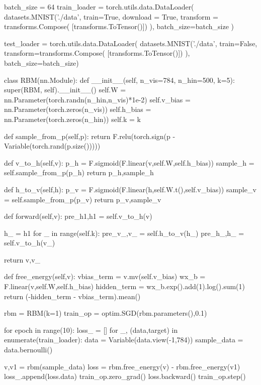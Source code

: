 \documentclass[%
oneside,                 %
final,                   %
10pt]{article}
\begin{document}
batch_size = 64
train_loader = torch.utils.data.DataLoader(
datasets.MNIST('./data',
    train=True,
    download = True,
    transform = transforms.Compose(
        [transforms.ToTensor()])
     ),
     batch_size=batch_size
)

test_loader = torch.utils.data.DataLoader(
datasets.MNIST('./data',
    train=False,
    transform=transforms.Compose(
    [transforms.ToTensor()])
    ),
    batch_size=batch_size)


class RBM(nn.Module):
   def __init__(self,
               n_vis=784,
               n_hin=500,
               k=5):
        super(RBM, self).__init__()
        self.W = nn.Parameter(torch.randn(n_hin,n_vis)*1e-2)
        self.v_bias = nn.Parameter(torch.zeros(n_vis))
        self.h_bias = nn.Parameter(torch.zeros(n_hin))
        self.k = k
    
   def sample_from_p(self,p):
       return F.relu(torch.sign(p - Variable(torch.rand(p.size()))))
    
   def v_to_h(self,v):
        p_h = F.sigmoid(F.linear(v,self.W,self.h_bias))
        sample_h = self.sample_from_p(p_h)
        return p_h,sample_h
    
   def h_to_v(self,h):
        p_v = F.sigmoid(F.linear(h,self.W.t(),self.v_bias))
        sample_v = self.sample_from_p(p_v)
        return p_v,sample_v
        
   def forward(self,v):
        pre_h1,h1 = self.v_to_h(v)
        
        h_ = h1
        for _ in range(self.k):
            pre_v_,v_ = self.h_to_v(h_)
            pre_h_,h_ = self.v_to_h(v_)
        
        return v,v_
    
   def free_energy(self,v):
        vbias_term = v.mv(self.v_bias)
        wx_b = F.linear(v,self.W,self.h_bias)
        hidden_term = wx_b.exp().add(1).log().sum(1)
        return (-hidden_term - vbias_term).mean()




rbm = RBM(k=1)
train_op = optim.SGD(rbm.parameters(),0.1)

for epoch in range(10):
    loss_ = []
    for _, (data,target) in enumerate(train_loader):
        data = Variable(data.view(-1,784))
        sample_data = data.bernoulli()
        
        v,v1 = rbm(sample_data)
        loss = rbm.free_energy(v) - rbm.free_energy(v1)
        loss_.append(loss.data)
        train_op.zero_grad()
        loss.backward()
        train_op.step()
\end{document}

